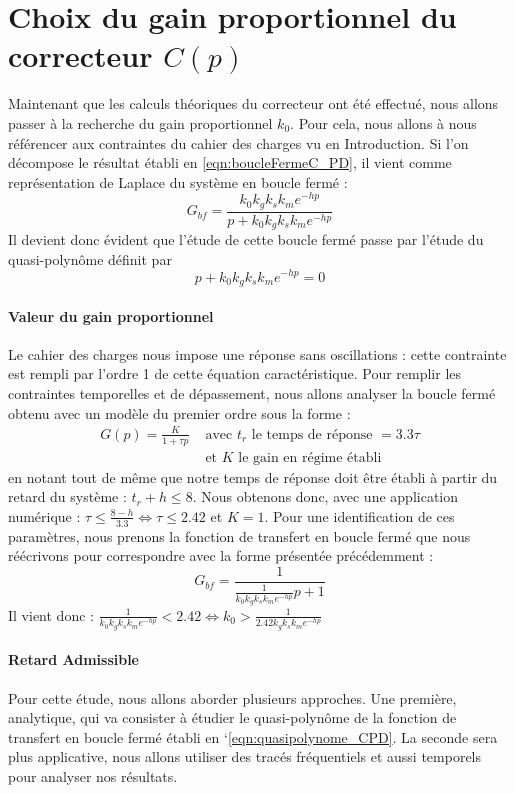 \section{Choix du gain proportionnel du correcteur $C(p)$}
Maintenant que les calculs théoriques du correcteur ont été effectué, nous allons passer à la recherche du gain proportionnel $k_0$. Pour cela, nous allons à nous référencer aux contraintes du cahier des charges vu en Introduction. Si l'on décompose le résultat établi en \ref{eqn:boucleFermeC_PD}, il vient comme représentation de Laplace du système en boucle fermé :
\begin{equation}
G_{bf} = \frac{k_0k_gk_sk_me^{-hp}}{p+k_0k_gk_sk_me^{-hp}}
\end{equation}
Il devient donc évident que l'étude de cette boucle fermé passe par l'étude du quasi-polynôme définit par \begin{equation}\label{eqn:quasipolynome_CPD}
p+k_0k_gk_sk_me^{-hp}=0
\end{equation}

\paragraph*{Valeur du gain proportionnel}
Le cahier des charges nous impose une réponse sans oscillations : cette contrainte est rempli par l'ordre 1 de cette équation caractéristique. Pour remplir les contraintes temporelles et de dépassement, nous allons analyser la boucle fermé obtenu avec un modèle du premier ordre sous la forme : 
\begin{align*}
G(p) = \frac{K}{1+\tau p} &\text{ avec }t_r \text{ le temps de réponse } = 3.3\tau \\& \text{ et } K \text{ le gain en régime établi} 
\end{align*}
en notant tout de même que notre temps de réponse doit être établi à partir du retard du système : $t_r + h \leq 8$. Nous obtenons donc, avec une application numérique : $\tau \leq \frac{8-h}{3.3} \Leftrightarrow \tau \leq 2.42$ et $K=1$. 
Pour une identification de ces paramètres, nous prenons la fonction de transfert en boucle fermé que nous réécrivons pour correspondre avec la forme présentée précédemment : 
\begin{equation}
G_{bf} = \frac{1}{\frac{1}{k_0k_gk_sk_me^{-hp}}p+1}
\end{equation} 
Il vient donc : $\frac{1}{k_0k_gk_sk_me^{-hp}} < 2.42 \Leftrightarrow k_0 > \frac{1}{2.42k_gk_sk_me^{-hp}}$


\paragraph*{Retard Admissible}
Pour cette étude, nous allons aborder plusieurs approches. Une première, analytique, qui va consister à étudier le quasi-polynôme de la fonction de transfert en boucle fermé établi en `\ref{eqn:quasipolynome_CPD}. La seconde sera plus applicative, nous allons utiliser des tracés fréquentiels et aussi temporels pour analyser nos résultats.


